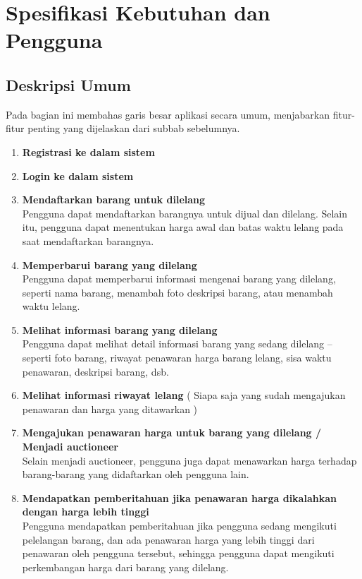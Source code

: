 \section{Spesifikasi Kebutuhan dan Pengguna}
   
  \subsection{Deskripsi Umum}
  
  Pada bagian ini membahas garis besar aplikasi secara umum, menjabarkan fitur-fitur penting yang dijelaskan dari subbab sebelumnya.\\
  
  \begin{enumerate}
  \vspace{-5mm}
  \item \textbf{Registrasi ke dalam sistem}
    \item \textbf{Login ke dalam sistem}
    \item \textbf{Mendaftarkan barang untuk dilelang} \\
        Pengguna dapat mendaftarkan barangnya untuk dijual dan dilelang. Selain itu, pengguna dapat menentukan harga awal dan batas waktu lelang pada saat mendaftarkan barangnya.
    \item \textbf{Memperbarui barang yang dilelang} \\
        Pengguna dapat memperbarui informasi mengenai barang yang dilelang, seperti nama barang, menambah foto deskripsi barang, atau menambah waktu lelang.
    \item \textbf{Melihat informasi barang yang dilelang} \\
        Pengguna dapat melihat detail informasi barang yang sedang dilelang – seperti foto barang, riwayat penawaran harga barang lelang, sisa waktu penawaran, deskripsi barang, dsb.
    \item \textbf{Melihat informasi riwayat lelang} ( Siapa saja yang sudah mengajukan penawaran dan harga yang ditawarkan )
    \item \textbf{Mengajukan penawaran harga untuk barang yang dilelang / Menjadi auctioneer} \\
        Selain menjadi auctioneer, pengguna juga dapat menawarkan harga terhadap barang-barang yang didaftarkan oleh pengguna lain.
    \item \textbf{Mendapatkan pemberitahuan jika penawaran harga dikalahkan dengan harga lebih tinggi} \\
        Pengguna mendapatkan pemberitahuan jika pengguna sedang mengikuti pelelangan barang, dan ada penawaran harga yang lebih tinggi dari penawaran oleh pengguna tersebut, sehingga pengguna dapat mengikuti perkembangan harga dari barang yang dilelang.

\end{enumerate}
